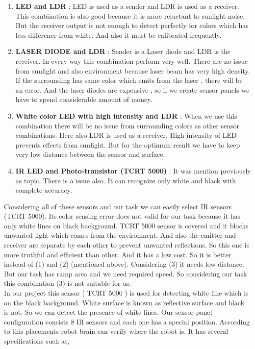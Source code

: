 \documentclass[a4paper,11pt,twocolumn]{article}
\begin{document}
\begin{enumerate}[1]
	\item \textbf{LED and LDR} : LED is used as a sender and LDR is used as a receiver. This combination is also good because it is more reluctant to sunlight noise. But the receiver output is not enough to detect perfectly for colors which has less difference from white. And also it must be calibrated frequently.
	
	\item \textbf{LASER DIODE and LDR} : Sender is a Laser diode and LDR is the receiver. In every way this combination perform very well. There are no issue from sunlight and also environment because laser beam has very high density. If the surrounding has same color which emits from the laser , there will be an error. And the laser diodes are expensive , so if we create sensor panels we have to spend considerable  amount of money.
	
	\item  \textbf{White color LED with high intensity and LDR} : When we use this combination there will be no issue from surrounding colors as other sensor combinations. Here also LDR is used as a receiver. High intensity of LED  prevents effects from sunlight. But for the optimum result we have to keep very low  distance between the sensor and surface.
	
	\item \textbf{IR LED and Photo-transistor (TCRT 5000)} : It was mention previously as topic. There is a issue also. It can recognize only white and black  with complete accuracy.
\end{enumerate} 

Considering all of these sensors and our task we can easily select IR sensors (TCRT 5000).  Its color sensing error does not valid for our task because it has only white lines on black background. TCRT 5000 sensor is covered and it blocks unwanted light which comes from the environment. And also the emitter and receiver are separate by each other to prevent unwanted reflections. So this one is more truthful and  efficient than other. And it  has a low cost. So it is better instead of (1) and (2) (mentioned above). Considering (3) it needs low distance. But our task has ramp area and we need required speed. So considering our task this combination (3) is not suitable for us.\\
In our project this sensor ( TCRT 5000 ) is used for detecting white line which is on the black background. White surface is known as reflective surface and black is not. So we can detect the presence of white lines. Our sensor panel configuration consists 8 IR sensors and each one has a special position. According to this placements robot brain can verify where the robot is. It has several specifications such as\cite{pinout},
\end{document}
